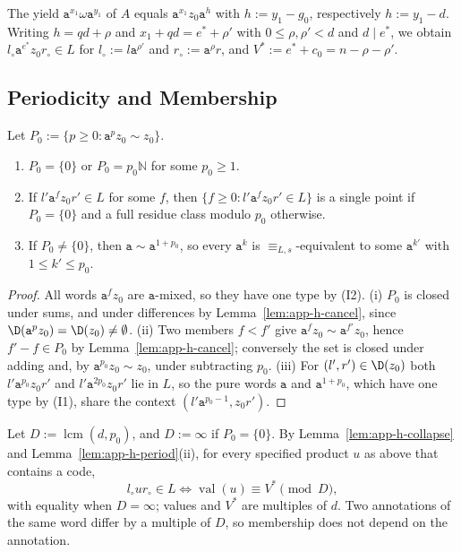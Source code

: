 The yield $\mathtt a^{x_1}\omega\mathtt a^{y_1}$ of $A$ equals $\mathtt
a^{x_1}z_0\mathtt a^{h}$ with $h:=y_1-g_0$, respectively $h:=y_1-d$.  Writing
$h=qd+\rho$ and $x_1+qd=e^*+\rho'$ with $0\le\rho,\rho'<d$ and $d\mid e^*$, we
obtain $l_\circ\mathtt a^{e^*}z_0r_\circ\in L$ for $l_\circ:=l\mathtt a^{\rho'}$
and $r_\circ:=\mathtt a^\rho r$, and $V^*:=e^*+c_0=n-\rho-\rho'$.

\subsection{Periodicity and Membership}

\begin{lemma}
\label{lem:app-h-period}
Let $P_0:=\{p\ge0:\mathtt a^pz_0\sim z_0\}$.
\begin{enumerate}[label=\textup{(\roman*)},leftmargin=*]
\item $P_0=\{0\}$ or $P_0=p_0\mathbb N$ for some $p_0\ge1$.
\item If $l'\mathtt a^fz_0r'\in L$ for some $f$, then
$\{f\ge0:l'\mathtt a^fz_0r'\in L\}$ is a single point if $P_0=\{0\}$ and a
full residue class modulo $p_0$ otherwise.
\item If $P_0\ne\{0\}$, then $\mathtt a\sim\mathtt a^{1+p_0}$, so every
$\mathtt a^k$ is $\equiv_{L,s}$-equivalent to some $\mathtt a^{k'}$ with $1\le k'\le p_0$.
\end{enumerate}
\end{lemma}

\begin{proof}
All words $\mathtt a^fz_0$ are $\mathtt a$-mixed, so they have one type by (I2).
(i) $P_0$ is closed under sums, and under differences by
Lemma~\ref{lem:app-h-cancel}, since $\D(\mathtt a^pz_0)=\D(z_0)\ne\emptyset$.
(ii) Two members $f<f'$ give $\mathtt a^fz_0\sim\mathtt a^{f'}z_0$, hence
$f'-f\in P_0$ by Lemma~\ref{lem:app-h-cancel}; conversely the set is closed
under adding and, by $\mathtt a^{p_0}z_0\sim z_0$, under subtracting $p_0$.  (iii)
For $(l',r')\in\D(z_0)$ both $l'\mathtt a^{p_0}z_0r'$ and $l'\mathtt
a^{2p_0}z_0r'$ lie in $L$, so the pure words $\mathtt a$ and $\mathtt a^{1+p_0}$,
which have one type by (I1), share the context $(l'\mathtt a^{p_0-1},z_0r')$.
\end{proof}

Let $D:=\operatorname{lcm}(d,p_0)$, and $D:=\infty$ if $P_0=\{0\}$.  By
Lemma~\ref{lem:app-h-collapse} and Lemma~\ref{lem:app-h-period}(ii), for
every specified product $u$ as above that contains a code,
\begin{equation}
\label{eq:app-h-member}
 l_\circ ur_\circ\in L\iff\operatorname{val}(u)\equiv V^*\pmod D,
\end{equation}
with equality when $D=\infty$; values and $V^*$ are multiples of $d$.  Two
annotations of the same word differ by a multiple of $D$, so membership does
not depend on the annotation.

